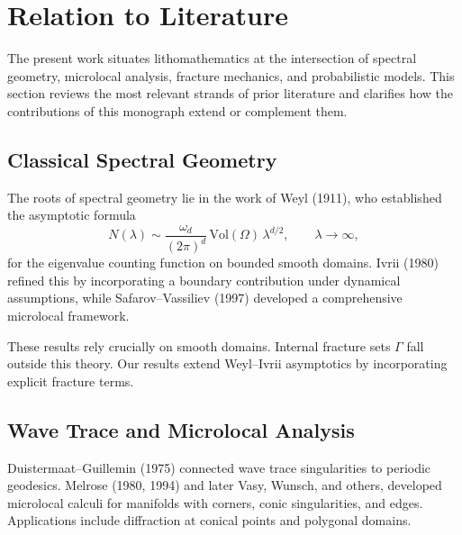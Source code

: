 

\section{Relation to Literature}

The present work situates lithomathematics at the intersection of spectral
geometry, microlocal analysis, fracture mechanics, and probabilistic models.
This section reviews the most relevant strands of prior literature and clarifies
how the contributions of this monograph extend or complement them.

\subsection{Classical Spectral Geometry}

The roots of spectral geometry lie in the work of Weyl (1911), who established
the asymptotic formula
\[
N(\lambda) \sim \frac{\omega_d}{(2\pi)^d}\,\mathrm{Vol}(\Omega)\,\lambda^{d/2},
\qquad \lambda \to \infty,
\]
for the eigenvalue counting function on bounded smooth domains. Ivrii
(1980) refined this by incorporating a boundary contribution under dynamical
assumptions, while Safarov–Vassiliev (1997) developed a comprehensive microlocal
framework.

These results rely crucially on smooth domains. Internal fracture sets $\Gamma$
fall outside this theory. Our results extend Weyl–Ivrii asymptotics by
incorporating explicit fracture terms.

\subsection{Wave Trace and Microlocal Analysis}

Duistermaat–Guillemin (1975) connected wave trace singularities to periodic
geodesics. Melrose (1980, 1994) and later Vasy, Wunsch, and others, developed
microlocal calculi for manifolds with corners, conic singularities, and edges.
Applications include diffraction at conical points and polygonal domains.

